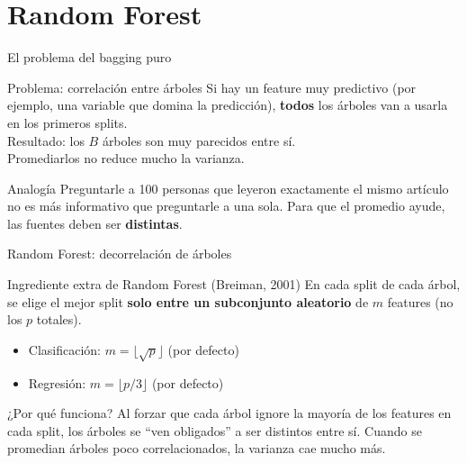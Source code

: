 \documentclass[aspectratio=169]{beamer}
\begin{document}
\section{Random Forest}

\begin{frame}{El problema del bagging puro}
  \begin{alertblock}{Problema: correlación entre árboles}
    Si hay un feature muy predictivo (por ejemplo, una variable que domina la predicción),
    \textbf{todos} los árboles van a usarla en los primeros splits.\\
    Resultado: los $B$ árboles son muy parecidos entre sí.\\
    Promediarlos no reduce mucho la varianza.
  \end{alertblock}

  \medskip
  \begin{exampleblock}{Analogía}
    Preguntarle a 100 personas que leyeron exactamente el mismo artículo no es
    más informativo que preguntarle a una sola.
    Para que el promedio ayude, las fuentes deben ser \textbf{distintas}.
  \end{exampleblock}
\end{frame}

\begin{frame}{Random Forest: decorrelación de árboles}
  \begin{block}{Ingrediente extra de Random Forest (Breiman, 2001)}
    En cada split de cada árbol, se elige el mejor split \textbf{solo entre un subconjunto aleatorio} de $m$ features (no los $p$ totales).
  \end{block}

  \medskip
  \begin{itemize}
    \item Clasificación: $m = \lfloor\sqrt{p}\rfloor$ (por defecto)
    \item Regresión: $m = \lfloor p/3 \rfloor$ (por defecto)
  \end{itemize}

  \medskip
  \begin{exampleblock}{¿Por qué funciona?}
    Al forzar que cada árbol ignore la mayoría de los features en cada split,
    los árboles se ``ven obligados'' a ser distintos entre sí.
    Cuando se promedian árboles poco correlacionados, la varianza cae mucho más.
  \end{exampleblock}
\end{frame}
\end{document}
